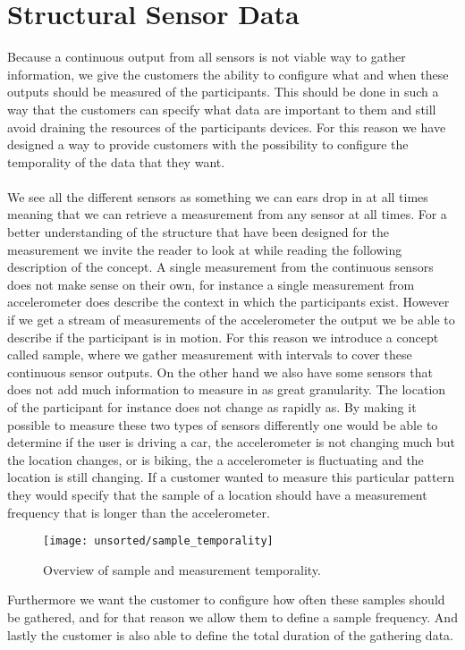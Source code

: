 \section{Structural Sensor Data}
\label{sec:structural_sensor_data}
Because a continuous output from all sensors is not viable way to gather information, we give the customers the ability to configure what and when these outputs should be measured of the participants. This should be done in such a way that the customers can specify what data are important to them and still avoid draining the resources of the participants devices. For this reason we have designed a way to provide customers with the possibility to configure the temporality of the data that they want. 
\\\\
We see all the different sensors as something we can ears drop in at all times meaning that we can retrieve a measurement from any sensor at all times. For a better understanding of the structure that have been designed for the measurement we invite the reader to look at  while reading the following description of the concept. A single measurement from the continuous sensors does not make sense on their own, for instance a single measurement from accelerometer does describe the context in which the participants exist. However if we get a stream of measurements of the accelerometer the output we be able to describe if the participant is in motion. For this reason we introduce a concept called sample, where we gather measurement with intervals to cover these continuous sensor outputs. On the other hand we also have some sensors that does not add much information to measure in as great granularity. The location of the participant for instance does not change as rapidly as. By making it possible to measure these two types of sensors differently one would be able to determine if the user is driving a car, the accelerometer is not changing much but the location changes, or is biking, the a accelerometer is fluctuating and the location is still changing. If a customer wanted to measure this particular pattern they would specify that the sample of a location should have a measurement frequency that is longer than the accelerometer.
\begin{figure}[!htbp]
    \centering
    \texttt{[image: unsorted/sample\_temporality]}
    \caption{Overview of sample and measurement temporality.}
    \label{fig:sample_temporality}
\end{figure}
\FloatBarrier
Furthermore we want the customer to configure how often these samples should be gathered, and for that reason we allow them to define a sample frequency. And lastly the customer is also able to define the total duration of the gathering data.

